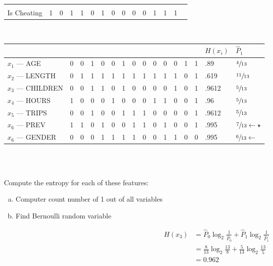 \documentclass{article}
\theoremstyle{definition}
\begin{document}
\begin{center}
\begin{tabular}{|l||c|c|c|c|c|c|c|c|c|c|c|c|c||c|}
        \multicolumn{1}{|c}{} \\
        \cline{1-14}
        Is Cheating & 1 & 0 & 1 & 1 & 0 & 1 & 0 & 0 & 0 & 0 & 1 & 1 & 1 &
        \multicolumn{1}{|c}{} \\
        \cline{1-14}
      \end{tabular}
      \\
      \vspace{1cm}
      \begin{tabular}{|l||r|r|r|r|r|r|r|r|r|r|r|r|r||l||l|}
        \cline{15-16}
        \multicolumn{14}{c|}{} & $H(x_i)$ & $\hat{P}_1$ \\ \hline
        $x_1$ --- AGE & 0 & 0 & 1 & 0 & 0 & 1 & 0 & 0 & 0 & 0 & 0 & 1 & 1 &
        .89 & $\sfrac{4}{13}$ \\ \hline
        $x_2$ --- LENGTH & 0 & 1 & 1 & 1 & 1 & 1 & 1 & 1 & 1 & 1 & 1 & 0 & 1 &
        .619 & $\sfrac{11}{13}$ \\ \hline
        $x_3$ --- CHILDREN & 0 & 0 & 1 & 1 & 0 & 1 & 0 & 0 & 0 & 0 & 1 & 0 & 1 &
        .9612 & $\sfrac{5}{13}$ \\ \hline
        $x_4$ --- HOURS & 1 & 0 & 0 & 0 & 1 & 0 & 0 & 0 & 1 & 1 & 0 & 0 & 1 &
        .96 & $\sfrac{5}{13}$ \\ \hline
        $x_5$ --- TRIPS & 0 & 0 & 1 & 0 & 0 & 1 & 1 & 1 & 0 & 0 & 0 & 0 & 1 &
        .9612 & $\sfrac{5}{13}$ \\ \hline
        $x_6$ --- PREV & 1 & 1 & 0 & 1 & 0 & 0 & 1 & 1 & 0 & 1 & 0 & 0 & 1 &
        .995 & $\sfrac{7}{13} \leftarrow \star$ \\ \hline
        $x_6$ --- GENDER & 0 & 0 & 0 & 1 & 1 & 1 & 1 & 0 & 0 & 1 & 1 & 0 & 0 &
        .995 & $\sfrac{6}{13} \leftarrow$ \\ \hline
      \end{tabular} \\ \ \\
      \vspace{1cm}
    \end{center}
    Compute the entropy for each of these features:
    \begin{enumerate}[(a)]
      \item Computer count number of 1 out of all variables
      \item Find Bernoulli random variable
    \end{enumerate}
    \begin{align*}
      H(x_3) &= \hat{P}_0 \log_2 \frac{1}{\hat{P}_0} +
                \hat{P}_1 \log_2 \frac{1}{\hat{P}_1} \\
      &= \frac{8}{13} \log_2 \frac{13}{8} + \frac{5}{13} \log_2 \frac{13}{5} \\
      &= 0.962
    \end{align*} \\
\end{document}
